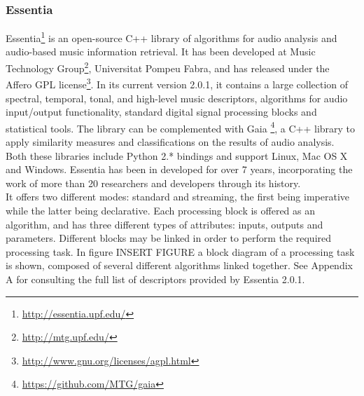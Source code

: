 \subsubsection*{Essentia}
Essentia\footnote{\url{http://essentia.upf.edu/}} is an open-source C++ library of algorithms for audio analysis and audio-based music information retrieval. It has been developed at Music Technology Group\footnote{\url{http://mtg.upf.edu/}}, Universitat Pompeu Fabra, and has released under the Affero GPL license\footnote{\url{http://www.gnu.org/licenses/agpl.html}}. In its current version 2.0.1, it contains a large collection of spectral, temporal, tonal, and high-level music descriptors, algorithms for audio input/output functionality, standard digital signal processing blocks and statistical tools. The library can be complemented with Gaia \footnote{\url{https://github.com/MTG/gaia}}, a C++ library to apply similarity measures and classifications on the results of audio analysis. Both these libraries include Python 2.* bindings and support Linux, Mac OS X and Windows. Essentia has been in developed for over 7 years, incorporating the work of more than 20 researchers and developers through its history. \\
It offers two different modes: standard and streaming, the first being imperative while the latter being declarative. Each processing block is offered as an algorithm, and has three different types of attributes: inputs, outputs and parameters. Different blocks may be linked in order to perform the required processing task. In figure INSERT FIGURE a block diagram of a processing task is shown, composed of several different algorithms linked together. See Appendix A for consulting the full list of descriptors provided by Essentia 2.0.1.



